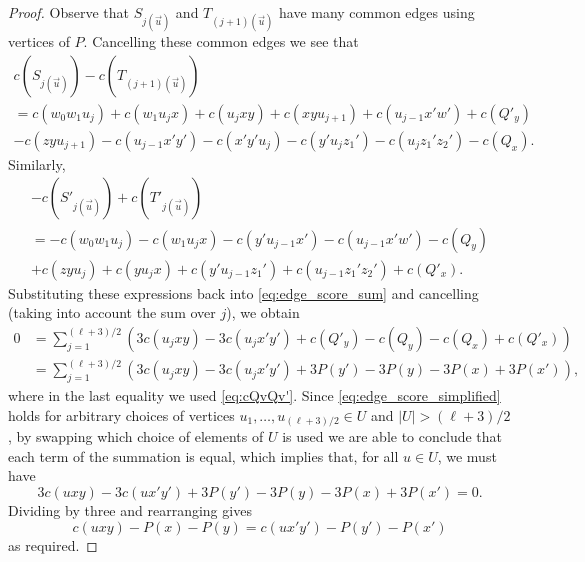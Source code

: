 \documentclass[A4paper,12pt]{article}
\theoremstyle{definition}
\begin{document}
\begin{proof}
    Observe that $ S_{j(\vec{u})}$ and $T_{(j+1)(\vec{u})}$ have many common edges using vertices of $P$. Cancelling these common edges we see that
    \begin{multline*}
    c(S_{j(\vec{u})}) - c(T_{(j+1)(\vec{u})})  \\ = c(w_0w_1u_j) + c(w_1u_jx) + c(u_jxy) + c(xyu_{j+1}) + c(u_{j-1}x'w') + c(Q'_y)
    \\- c(zyu_{j+1}) - c(u_{j-1}x'y') - c(x'y'u_{j}) - c(y'u_{j}z_1') - c(u_jz_1'z_2')  -c(Q_x).
    \end{multline*}
   Similarly,
      \begin{multline*}
    - c( S'_{j(\vec{u})}) +c( T'_{j(\vec{u})})  \\ = -c(w_0w_1u_j) - c(w_1u_jx) - c(y'u_{j-1}x') - c(u_{j-1}x'w') - c(Q_y)
    \\+ c(zyu_{j}) + c(yu_jx) + c(y'u_{j-1}z_1') + c(u_{j-1}z_1'z_2')  + c(Q'_x).
    \end{multline*}
    Substituting these expressions back into \eqref{eq:edge_score_sum} and cancelling (taking into account the sum over $j$), we obtain
      \begin{align} 0 
    &= \sum_{j=1}^{(\ell+3)/2}\left( 3c(u_jxy) - 3c(u_jx'y') + c(Q'_y) - c(Q_y) - c(Q_x) + c(Q'_x)\right) \nonumber \\
    & = \sum_{j=1}^{(\ell+3)/2}\left( 3c(u_jxy) - 3c(u_jx'y') + 3P(y') - 3P(y) - 3P(x) + 3P(x')\right),
    \label{eq:edge_score_simplified}
    \end{align}
   where in the last equality we used \eqref{eq:cQvQv'}. Since \eqref{eq:edge_score_simplified} holds for arbitrary choices of vertices $u_1,\ldots, u_{(\ell+3)/2} \in U$ and $|U| > (\ell+3)/2$, by swapping which choice of elements of $U$ is used we are able to conclude that each term of the summation is equal, which implies that, for all $u \in U$, we must have
    \[ 3c(uxy) - 3c(ux'y') + 3P(y') - 3P(y) - 3P(x) + 3P(x') = 0.\]
    Dividing by three and rearranging gives
    \[ c(uxy) - P(x) - P(y) = c(ux'y') - P(y') - P(x')\]
    as required.
\end{proof}
\end{document}
